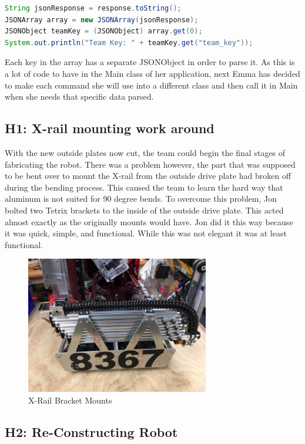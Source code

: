\documentclass{article}
\begin{document}
\begin{lstlisting}[language=Java]
String jsonResponse = response.toString();
JSONArray array = new JSONArray(jsonResponse);
JSONObject teamKey = (JSONObject) array.get(0);
System.out.println("Team Key: " + teamKey.get("team_key"));

\end{lstlisting}

Each key in the array has a separate JSONObject in order to parse it. As this is a lot of code to have in the Main class of her application, next Emma has decided to make each command she will use into a different class and then call it in Main when she needs that specific data parsed. 
\subsection{H1: X-rail mounting work around}

With the new outside plates now cut, the team could begin the final stages of fabricating the robot. There was a problem however, the part that was supposed to be bent over to mount the X-rail from the outside drive plate had broken off during the bending process. This caused the team to learn the hard way that aluminum is not suited for 90 degree bends. To overcome this problem, Jon bolted two Tetrix brackets to the inside of the outside drive plate. This acted almost exactly as the originally mounts would have. Jon did it this way because it was quick, simple, and functional. While this was not elegant it was at least functional.

\begin{figure}
    \centering
    \includegraphics[height=6cm]{18_12-31/images/Xrail.JPG}
    \caption{X-Rail Bracket Mounts}
    \label{X-Rail Mounts}
\end{figure}



\subsection{H2: Re-Constructing Robot}
\end{document}
